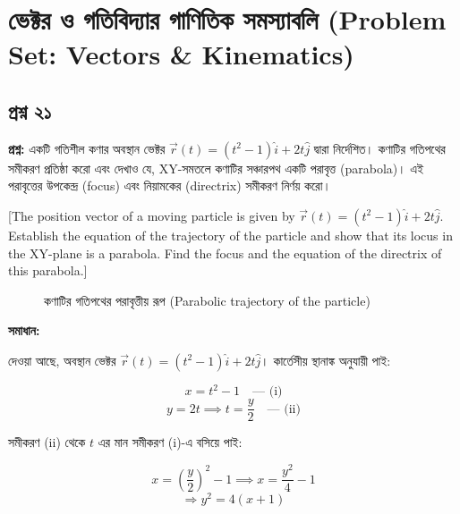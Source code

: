 \documentclass{article}
\begin{document}
\section*{ভেক্টর ও গতিবিদ্যার গাণিতিক সমস্যাবলি (Problem Set: Vectors \& Kinematics)}

\subsection*{প্রশ্ন ২১}
\textbf{প্রশ্ন:} একটি গতিশীল কণার অবস্থান ভেক্টর $\vec{r}(t) = (t^2 - 1)\hat{i} + 2t\hat{j}$ দ্বারা নির্দেশিত। কণাটির গতিপথের সমীকরণ প্রতিষ্ঠা করো এবং দেখাও যে, XY-সমতলে কণাটির সঞ্চারপথ একটি পরাবৃত্ত (parabola)। এই পরাবৃত্তের উপকেন্দ্র (focus) এবং নিয়ামকের (directrix) সমীকরণ নির্ণয় করো। 

[The position vector of a moving particle is given by $\vec{r}(t) = (t^2 - 1)\hat{i} + 2t\hat{j}$. Establish the equation of the trajectory of the particle and show that its locus in the XY-plane is a parabola. Find the focus and the equation of the directrix of this parabola.]

\begin{figure}[h!]
\centering
{}
\caption{কণাটির গতিপথের পরাবৃত্তীয় রূপ (Parabolic trajectory of the particle)}
\end{figure}

\textbf{সমাধান:}

দেওয়া আছে, অবস্থান ভেক্টর $\vec{r}(t) = (t^2 - 1)\hat{i} + 2t\hat{j}$। কার্তেসীয় স্থানাঙ্ক অনুযায়ী পাই:

$$x = t^2 - 1 \quad \text{--- (i)}$$
$$y = 2t \implies t = \frac{y}{2} \quad \text{--- (ii)}$$

সমীকরণ (ii) থেকে $t$ এর মান সমীকরণ (i)-এ বসিয়ে পাই:

$$x = \left(\frac{y}{2}\right)^2 - 1 \implies x = \frac{y^2}{4} - 1$$
$$\Rightarrow y^2 = 4(x + 1)$$
\end{document}
